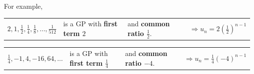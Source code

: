 \documentclass[11pt,a4paper]{book}
\begin{document}
For example,

\begin{tasks}[label=(\alph*),label-width=3.5ex]

\task  %
\begin{tabular}{>{\raggedright}p{3cm}>{\raggedright}p{4.2cm}>{\raggedright}p{3.8cm}>{\raggedright}p{4cm}}
${\displaystyle 2,1,\frac{1}{2},\frac{1}{4},\frac{1}{8},\ldots,\frac{1}{512}}$ & is a GP with \textbf{first term $2$} & and \textbf{common ratio ${\displaystyle \frac{1}{2}}$}.  & $\Rightarrow{\displaystyle u_{n}=2\left(\frac{1}{2}\right)^{n-1}}$\tabularnewline
\end{tabular}

\task  %
\begin{tabular}{>{\raggedright}p{3cm}>{\raggedright}p{4.2cm}>{\raggedright}p{3.8cm}>{\raggedright}p{4cm}}
${\displaystyle \frac{1}{4},-1,4,-16,64,\ldots}$ & is a GP with \textbf{first term ${\displaystyle \frac{1}{4}}$} & and \textbf{common ratio $-4$}.  & $\Rightarrow{\displaystyle u_{n}=\frac{1}{4}\left(-4\right)^{n-1}}$\tabularnewline
\end{tabular}

\end{tasks}
\end{document}
